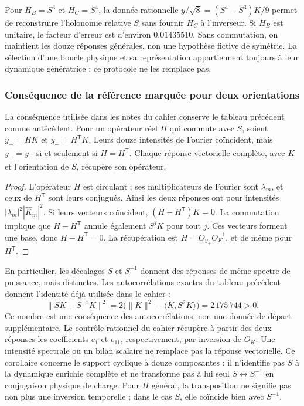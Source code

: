 Pour \(H_B=S^3\) et \(H_C=S^4\), la donnée rationnelle
\(y/\sqrt8=(S^4-S^3)K/9\) permet de reconstruire l’holonomie relative
\(S\) sans fournir \(H_C\) à l’inverseur. Si \(H_B\) est
unitaire, le facteur d’erreur est d’environ \(0.01435510\). Sans
commutation, on maintient les douze réponses générales, non une hypothèse
fictive de symétrie. La sélection d’une boucle physique et sa représentation
appartiennent toujours à leur dynamique génératrice ; ce protocole ne les
remplace pas.

\subsubsection{Conséquence de la référence marquée pour deux orientations}
\label{md:antmem:orientaciones}
La conséquence utilisée dans les notes du cahier conserve le tableau
précédent comme antécédent. Pour un opérateur réel \(H\) qui commute avec
\(S\), soient \(y_+=HK\) et \(y_-=H^{\mathsf T}K\).
Leurs douze intensités de Fourier coïncident, mais \(y_+=y_-\) si et seulement
si \(H=H^{\mathsf T}\). Chaque réponse vectorielle complète, avec
\(K\) et l’orientation de \(S\), récupère son opérateur.
\begin{proof}
L’opérateur \(H\) est circulant ; ses multiplicateurs de Fourier sont
\(\lambda_m\), et ceux de \(H^{\mathsf T}\) sont leurs conjugués.
Ainsi les deux réponses ont pour intensités
\(|\lambda_m|^2|\widehat K_m|^2\).
Si leurs vecteurs coïncident, \((H-H^{\mathsf T})K=0\).
La commutation implique que \(H-H^{\mathsf T}\) annule également \(S^jK\)
pour tout \(j\). Ces vecteurs forment une base, donc
\(H-H^{\mathsf T}=0\). La récupération est
\(H=O_{y_+}O_K^{-1}\), et de même pour \(H^{\mathsf T}\).
\end{proof}
En particulier, les décalages \(S\) et \(S^{-1}\) donnent des réponses
de même spectre de puissance, mais distinctes. Les autocorrélations
exactes du tableau précédent donnent l’identité déjà utilisée dans le cahier :
\begin{equation}
 \|SK-S^{-1}K\|^2
 =2\bigl(\|K\|^2-\langle K,S^2K\rangle\bigr)
 =2\,175\,744>0.
 \label{md:antmem:distancia-orientada}
\end{equation}
Ce nombre est une conséquence des autocorrélations, non une donnée
de départ supplémentaire. Le contrôle rationnel du cahier récupère à partir des deux
réponses les coefficients \(e_1\) et \(e_{11}\), respectivement, par
inversion de \(O_K\). Une intensité spectrale ou un bilan scalaire ne
remplace pas la réponse vectorielle.
Ce corollaire concerne le support cyclique à douze composantes :
il n’identifie pas \(S\) à la dynamique enrichie complète et ne transforme
pas à lui seul \(S\leftrightarrow S^{-1}\) en conjugaison physique de charge.
Pour \(H\) général, la transposition ne signifie pas non plus une inversion temporelle ;
dans le cas \(S\), elle coïncide bien avec \(S^{-1}\).

